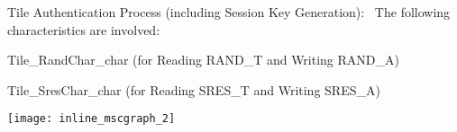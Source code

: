 Tile Authentication Process (including Session Key Generation)\+:~\newline
 The following characteristics are involved\+:
\begin{DoxyItemize}
\item Tile\+\_\+\+Rand\+Char\+\_\+char (for Reading R\+A\+N\+D\+\_\+T and Writing R\+A\+N\+D\+\_\+A)
\item Tile\+\_\+\+Sres\+Char\+\_\+char (for Reading S\+R\+E\+S\+\_\+T and Writing S\+R\+E\+S\+\_\+A)
\end{DoxyItemize}


\begin{DoxyImageNoCaption}
  \mbox{\texttt{[image: inline\_mscgraph\_2]}}
\end{DoxyImageNoCaption}
 